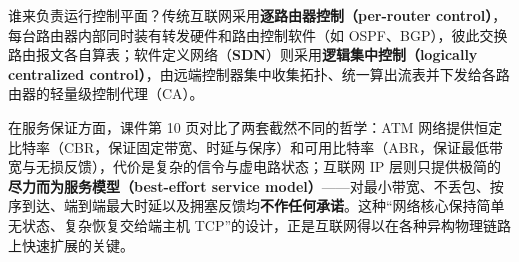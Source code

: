 谁来负责运行控制平面？传统互联网采用\textbf{逐路由器控制（per-router control）}，每台路由器内部同时装有转发硬件和路由控制软件（如 OSPF、BGP），彼此交换路由报文各自算表；软件定义网络（\textbf{SDN}）则采用\textbf{逻辑集中控制（logically centralized control）}，由远端控制器集中收集拓扑、统一算出流表并下发给各路由器的轻量级控制代理（CA）。

在服务保证方面，课件第 10 页对比了两套截然不同的哲学：ATM 网络提供恒定比特率（CBR，保证固定带宽、时延与保序）和可用比特率（ABR，保证最低带宽与无损反馈），代价是复杂的信令与虚电路状态；互联网 IP 层则只提供极简的\textbf{尽力而为服务模型（best-effort service model）}——对最小带宽、不丢包、按序到达、端到端最大时延以及拥塞反馈均\textbf{不作任何承诺}。这种“网络核心保持简单无状态、复杂恢复交给端主机 TCP”的设计，正是互联网得以在各种异构物理链路上快速扩展的关键。



